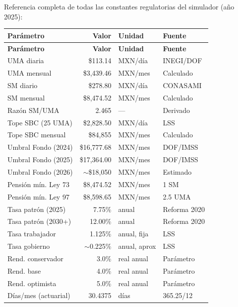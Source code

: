 \documentclass[11pt,a4paper]{report}
\begin{document}
\begin{tcolorbox}[colback=blue!5!white, colframe=blue!75!black, title=\textbf{Definici\'on Formal}]
Referencia completa de todas las constantes regulatorias del simulador (a\~no 2025):

\begin{center}
\begin{longtable}{lrll}
\toprule
\textbf{Par\'ametro} & \textbf{Valor} & \textbf{Unidad} & \textbf{Fuente} \\
\midrule
\endfirsthead
\toprule
\textbf{Par\'ametro} & \textbf{Valor} & \textbf{Unidad} & \textbf{Fuente} \\
\midrule
\endhead
UMA diaria & \$113.14 & MXN/d\'ia & INEGI/DOF \\
UMA mensual & \$3,439.46 & MXN/mes & Calculado \\
SM diario & \$278.80 & MXN/d\'ia & CONASAMI \\
SM mensual & \$8,474.52 & MXN/mes & Calculado \\
Raz\'on SM/UMA & 2.465 & --- & Derivado \\
\midrule
Tope SBC (25 UMA) & \$2,828.50 & MXN/d\'ia & LSS \\
Tope SBC mensual & \$84,855 & MXN/mes & Calculado \\
\midrule
Umbral Fondo (2024) & \$16,777.68 & MXN/mes & DOF/IMSS \\
Umbral Fondo (2025) & \$17,364.00 & MXN/mes & DOF/IMSS \\
Umbral Fondo (2026) & $\sim$\$18,050 & MXN/mes & Estimado \\
\midrule
Pensi\'on m\'in. Ley 73 & \$8,474.52 & MXN/mes & 1 SM \\
Pensi\'on m\'in. Ley 97 & \$8,598.65 & MXN/mes & 2.5 UMA \\
\midrule
Tasa patr\'on (2025) & 7.75\% & anual & Reforma 2020 \\
Tasa patr\'on (2030+) & 12.00\% & anual & Reforma 2020 \\
Tasa trabajador & 1.125\% & anual, fija & LSS \\
Tasa gobierno & $\sim$0.225\% & anual, aprox & LSS \\
\midrule
Rend. conservador & 3.0\% & real anual & Par\'ametro \\
Rend. base & 4.0\% & real anual & Par\'ametro \\
Rend. optimista & 5.0\% & real anual & Par\'ametro \\
\midrule
D\'ias/mes (actuarial) & 30.4375 & d\'ias & 365.25/12 \\

\end{longtable}
\end{center}
\end{tcolorbox}
\end{document}
